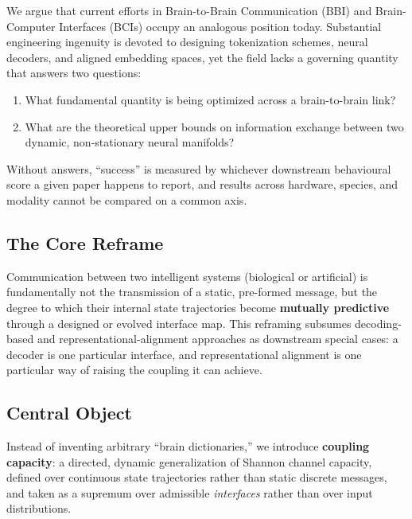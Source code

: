 \documentclass[11pt]{article}
\begin{document}
We argue that current efforts in Brain-to-Brain Communication (BBI) and Brain-Computer Interfaces (BCIs) occupy an analogous position today. Substantial engineering ingenuity is devoted to designing tokenization schemes, neural decoders, and aligned embedding spaces, yet the field lacks a governing quantity that answers two questions:
\begin{enumerate}
    \item What fundamental quantity is being optimized across a brain-to-brain link?
    \item What are the theoretical upper bounds on information exchange between two dynamic, non-stationary neural manifolds?
\end{enumerate}
Without answers, ``success'' is measured by whichever downstream behavioural score a given paper happens to report, and results across hardware, species, and modality cannot be compared on a common axis.

\subsection{The Core Reframe}
Communication between two intelligent systems (biological or artificial) is fundamentally not the transmission of a static, pre-formed message, but the degree to which their internal state trajectories become \textbf{mutually predictive} through a designed or evolved interface map. This reframing subsumes decoding-based and representational-alignment approaches as downstream special cases: a decoder is one particular interface, and representational alignment is one particular way of raising the coupling it can achieve.

\subsection{Central Object}
Instead of inventing arbitrary ``brain dictionaries,'' we introduce \textbf{coupling capacity}: a directed, dynamic generalization of Shannon channel capacity, defined over continuous state trajectories rather than static discrete messages, and taken as a supremum over admissible \emph{interfaces} rather than over input distributions.
\end{document}

